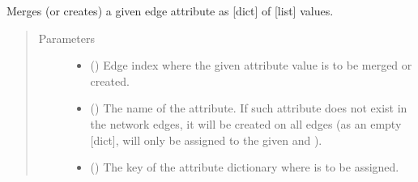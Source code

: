 \documentclass[letterpaper,10pt,english]{sphinxmanual}
\begin{document}
\begin{fulllineitems}
\begin{fulllineitems}
\label{\detokenize{reference:pypath.main.PyPath.acsn_effects}}
\end{fulllineitems}


\begin{fulllineitems}
\label{\detokenize{reference:pypath.main.PyPath.add_genesets}}
\end{fulllineitems}


\begin{fulllineitems}
\label{\detokenize{reference:pypath.main.PyPath.add_grouped_eattr}}
Merges (or creates) a given edge attribute as {[}dict{]} of {[}list{]}
values.
\begin{quote}\begin{description}
\item[{Parameters}] \leavevmode\begin{itemize}
\item {} 
 () \textendash{} Edge index where the given attribute value is to be merged
or created.

\item {} 
 () \textendash{} The name of the attribute. If such attribute does not exist
in the network edges, it will be created on all edges (as an
empty {[}dict{]},  will only be assigned to the given
 and ).

\item {} 
 () \textendash{} The key of the attribute dictionary where  is to be
assigned.


\end{itemize}
\end{description}
\end{quote}
\end{fulllineitems}
\end{fulllineitems}
\end{document}
